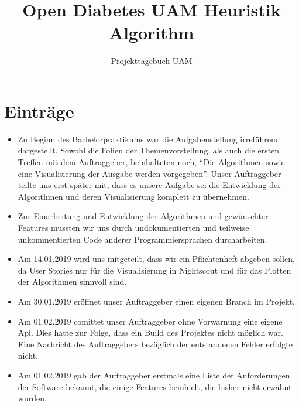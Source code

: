 \documentclass[accentcolor=tud0b,12pt,paper=a4]{tudreport}
\title{Open Diabetes UAM Heuristik Algorithm}
\subtitle{Projekttagebuch UAM}
\begin{document}
	\maketitle
		
	\newpage
	\chapter*{Einträge}
	
	
	\begin{itemize}
	
\item Zu Beginn des Bachelorpraktikums war die Aufgabenstellung irreführend dargestellt. Sowohl die Folien der Themenvorstellung, als auch die ersten Treffen mit dem Auftraggeber, beinhalteten noch, “Die Algorithmen sowie eine Visualisierung der Ausgabe werden vorgegeben”. Unser Auftraggeber teilte uns erst später mit, dass es unsere Aufgabe sei die Entwicklung der Algorithmen und deren Visualisierung komplett zu übernehmen.

\item Zur Einarbeitung und Entwicklung der Algorithmen und gewünschter Features mussten wir uns durch undokumentierten und teilweise unkommentierten Code anderer Programmiersprachen durcharbeiten.

\item Am 14.01.2019 wird uns mitgeteilt, dass wir ein Pflichtenheft abgeben sollen, da User Stories nur für die Visualisierung in Nightscout und für das Plotten der Algorithmen sinnvoll sind.

\item Am 30.01.2019 eröffnet unser Auftraggeber einen eigenen Branch im Projekt.

\item Am 01.02.2019 comittet unser Auftraggeber ohne Vorwarnung eine eigene Api. Dies hatte zur Folge, dass ein Build des Projektes nicht möglich war. Eine Nachricht des Auftraggebers bezüglich der entstandenen Fehler erfolgte nicht.

\item Am 01.02.2019 gab der Auftraggeber erstmals eine Liste der Anforderungen der Software bekannt, die einige Features beinhielt, die bisher nicht erwähnt wurden.


	
	\end{itemize}		

	
	
	
\end{document}

